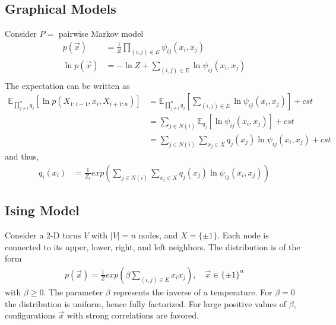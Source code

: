 \documentclass[11pt]{elegantbook}
\begin{document}
\subsection{Graphical Models}
Consider $P=$ pairwise Markov model
\begin{equation}
    \begin{aligned}
        p(\vec{x})&=\frac{1}{Z}\prod_{(i,j)\in E}\psi_{ij}(x_i,x_j)\\
        \ln p(\vec{x})&=-\ln{Z}+\sum_{(i,j)\in E}\ln\psi_{ij}(x_i,x_j)\\
    \end{aligned}
    \nonumber
\end{equation}
The expectation can be written as
\begin{equation}
    \begin{aligned}
        {\mathbb{E}_{\prod_{j\neq i}^nq_j}[\ln p(X_{1:i-1},x_i,X_{i+1:n})]}&=\mathbb{E}_{\prod_{j\neq i}^nq_j}[\sum_{(i,j)\in E}\ln\psi_{ij}(x_i,x_j)]+cst\\
        &=\sum_{j\in N(i)}\mathbb{E}_{q_j}[\ln\psi_{ij}(x_i,x_j)]+cst\\
        &=\sum_{j\in N(i)}\sum_{x_j\in X}q_j(x_j)\ln\psi_{ij}(x_i,x_j)+cst
    \end{aligned}
    \nonumber
\end{equation}
and thus,
\begin{equation}
    \begin{aligned}
        q_i(x_i)
        &=\frac{1}{Z_i}exp\left(\sum_{j\in N(i)}\sum_{x_j\in X}q_j(x_j)\ln\psi_{ij}(x_i,x_j)\right)
    \end{aligned}
    \nonumber
\end{equation}

\subsection{Ising Model}
Consider a 2-D torus $V$ with $|V| = n$ nodes, and $X = \{\pm 1\}$. Each node is connected to its upper, lower, right, and left neighbors. The distribution is of the form
\begin{equation}
    \begin{aligned}
        p(\vec{x})=\frac{1}{Z}exp\left(\beta\sum_{(i,j)\in E}x_ix_j\right),\quad \vec{x}\in \{\pm 1\}^n
    \end{aligned}
    \nonumber
\end{equation}
with $\beta \geq 0$. The parameter $\beta$ represents the inverse of a temperature. For $\beta = 0$ the distribution is uniform, hence fully factorized. For large positive values of $\beta$, configurations $\vec{x}$ with strong correlations are favored.
\end{document}
